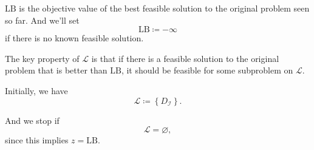 \begin{note}
	\(\mathrm{LB} \) is the objective value of the best feasible solution to the original problem seen so far. And we'll set
	\[
		\mathrm{LB} \coloneqq  -\infty
	\]
	if there is no known feasible solution.
\end{note}
\begin{remark}
	The key property of \(\mathcal{L} \) is that if there is a feasible solution to the original problem that is better than
	\(\mathrm{LB} \), it should be feasible for some subproblem on \(\mathcal{L} \).

	\par Initially, we have
	\[
		\mathcal{L} \coloneqq \left\{D_{\mathcal{I}}\right\}.
	\]

	\par And we stop if
	\[
		\mathcal{L} = \varnothing,
	\]
	since this implies \(z = \mathrm{LB} \).
\end{remark}

